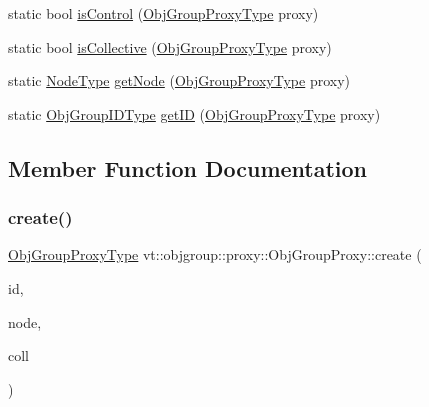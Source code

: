 \begin{DoxyCompactItemize}
static bool \hyperlink{structvt_1_1objgroup_1_1proxy_1_1_obj_group_proxy_a165dce2ea9c2f711132ed70e38c7835d}{is\+Control} (\hyperlink{namespacevt_ad7cae989df485fccca57f0792a880a8e}{Obj\+Group\+Proxy\+Type} proxy)
\item 
static bool \hyperlink{structvt_1_1objgroup_1_1proxy_1_1_obj_group_proxy_a457aec12597def45b485d3dc12023a32}{is\+Collective} (\hyperlink{namespacevt_ad7cae989df485fccca57f0792a880a8e}{Obj\+Group\+Proxy\+Type} proxy)
\item 
static \hyperlink{namespacevt_a866da9d0efc19c0a1ce79e9e492f47e2}{Node\+Type} \hyperlink{structvt_1_1objgroup_1_1proxy_1_1_obj_group_proxy_ac35fcfc81aac560d6cd16bc980c7d3b5}{get\+Node} (\hyperlink{namespacevt_ad7cae989df485fccca57f0792a880a8e}{Obj\+Group\+Proxy\+Type} proxy)
\item 
static \hyperlink{namespacevt_1_1objgroup_a54a50ff6833bf618e5bedb9a3b6d0e07}{Obj\+Group\+I\+D\+Type} \hyperlink{structvt_1_1objgroup_1_1proxy_1_1_obj_group_proxy_ad2d36832aa9ed3ee219a248d04d53dce}{get\+ID} (\hyperlink{namespacevt_ad7cae989df485fccca57f0792a880a8e}{Obj\+Group\+Proxy\+Type} proxy)
\end{DoxyCompactItemize}


\subsection{Member Function Documentation}
\mbox{\label{structvt_1_1objgroup_1_1proxy_1_1_obj_group_proxy_aacefa6e5a6ce4fd8581e21f945c52961}} 
\subsubsection{\texorpdfstring{create()}{create()}}
{\footnotesize\ttfamily \hyperlink{namespacevt_ad7cae989df485fccca57f0792a880a8e}{Obj\+Group\+Proxy\+Type} vt\+::objgroup\+::proxy\+::\+Obj\+Group\+Proxy\+::create (\begin{DoxyParamCaption}\item[{\hyperlink{namespacevt_1_1objgroup_a54a50ff6833bf618e5bedb9a3b6d0e07}{Obj\+Group\+I\+D\+Type}}]{id,  }\item[{\hyperlink{namespacevt_a866da9d0efc19c0a1ce79e9e492f47e2}{Node\+Type}}]{node,  }\item[{bool}]{coll }\end{DoxyParamCaption})\hspace{0.3cm}{\ttfamily [static]}}

